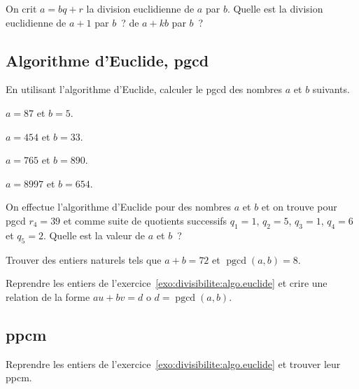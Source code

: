 \documentclass[a4paper,fleqn,openany]{trmbook}
\DeclareMathOperator{\pgcd}{pgcd}
\begin{document}
\begin{listeexercices}
\begin{exercice}
On crit $a = bq+r$ la division euclidienne de $a$ par $b$. Quelle est la division euclidienne de $a+1$ par $b$~? de $a+kb$ par $b$~?
\end{exercice}

\subsection{Algorithme d'Euclide, pgcd}

\begin{exercice}\label{exo:divisibilite:algo.euclide}
En utilisant l'algorithme d'Euclide, calculer le pgcd des nombres $a$ et $b$ suivants.
\begin{multicols}{2}
\begin{questions}
    \item $a = 87$ et $b = 5$.
    \item $a = 454$ et $b = 33$.
    \item $a = 765$ et $b = 890$.
    \item $a = 8997$ et $b = 654$.
\end{questions}
\end{multicols}
\end{exercice}

\begin{exercice}
On effectue l'algorithme d'Euclide pour des nombres $a$ et $b$ et on trouve pour pgcd $r_4 = 39$ et comme suite de quotients successifs $q_1 = 1$, $q_2 = 5$, $q_3 = 1$, $q_4 = 6$ et $q_5 = 2$. Quelle est la valeur de $a$ et $b$~?
\end{exercice}

\begin{exercice}
Trouver des entiers naturels tels que $a+b=72$ et $\pgcd(a,b) = 8$.
\end{exercice}

\begin{exercice}
Reprendre les entiers de l'exercice~\ref{exo:divisibilite:algo.euclide} et crire une relation de la forme $au+bv=d$ o $d = \pgcd(a,b)$.
\end{exercice}

\subsection{ppcm}

\begin{exercice}
Reprendre les entiers de l'exercice~\ref{exo:divisibilite:algo.euclide} et trouver leur ppcm.
\end{exercice}


\end{listeexercices}
\end{document}
